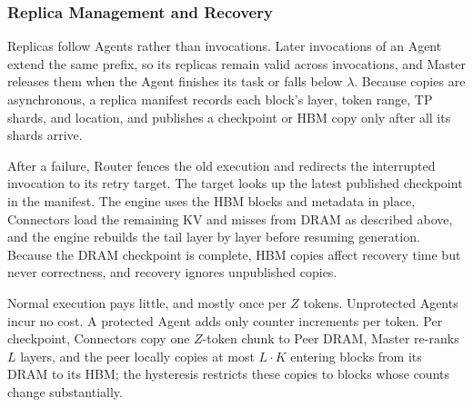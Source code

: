 \subsubsection{Replica Management and Recovery}
\label{sec:master-online}
\label{sec:execution}

Replicas follow Agents rather than invocations. Later invocations of an
Agent extend the same prefix, so its replicas remain valid across
invocations, and Master releases them when the Agent finishes its task or
falls below $\lambda$. Because copies are asynchronous, a replica manifest
records each block's layer, token range, TP shards, and location, and
publishes a checkpoint or HBM copy only after all its shards arrive.

After a failure, Router fences the old execution and redirects the
interrupted invocation to its retry target. The target looks up the
latest published checkpoint in the manifest. The engine uses the HBM
blocks and metadata in place, Connectors load the remaining KV and misses
from DRAM as described above, and the engine rebuilds the tail layer by
layer before resuming generation. Because the DRAM checkpoint is complete,
HBM copies affect recovery time but never correctness, and recovery
ignores unpublished copies.

Normal execution pays little, and mostly once per $Z$ tokens.
Unprotected Agents incur no cost. A protected Agent adds only counter
increments per token. Per checkpoint, Connectors copy one $Z$-token chunk
to Peer DRAM, Master re-ranks $L$ layers, and the peer locally copies at
most $L\cdot K$ entering blocks from its DRAM to its HBM; the hysteresis
restricts these copies to blocks whose counts change substantially.

